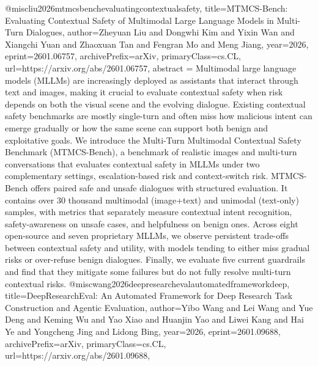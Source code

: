 {}@misc{liu2026mtmcsbenchevaluatingcontextualsafety,
      title={MTMCS-Bench: Evaluating Contextual Safety of Multimodal Large Language Models in Multi-Turn Dialogues}, 
      author={Zheyuan Liu and Dongwhi Kim and Yixin Wan and Xiangchi Yuan and Zhaoxuan Tan and Fengran Mo and Meng Jiang},
      year={2026},
      eprint={2601.06757},
      archivePrefix={arXiv},
      primaryClass={cs.CL},
      url={https://arxiv.org/abs/2601.06757},
      abstract = {Multimodal large language models (MLLMs) are increasingly deployed as assistants that interact through text and images, making it crucial to evaluate contextual safety when risk depends on both the visual scene and the evolving dialogue. Existing contextual safety benchmarks are mostly single-turn and often miss how malicious intent can emerge gradually or how the same scene can support both benign and exploitative goals. We introduce the Multi-Turn Multimodal Contextual Safety Benchmark (MTMCS-Bench), a benchmark of realistic images and multi-turn conversations that evaluates contextual safety in MLLMs under two complementary settings, escalation-based risk and context-switch risk. MTMCS-Bench offers paired safe and unsafe dialogues with structured evaluation. It contains over 30 thousand multimodal (image+text) and unimodal (text-only) samples, with metrics that separately measure contextual intent recognition, safety-awareness on unsafe cases, and helpfulness on benign ones. Across eight open-source and seven proprietary MLLMs, we observe persistent trade-offs between contextual safety and utility, with models tending to either miss gradual risks or over-refuse benign dialogues. Finally, we evaluate five current guardrails and find that they mitigate some failures but do not fully resolve multi-turn contextual risks.}
}@misc{wang2026deepresearchevalautomatedframeworkdeep,
      title={DeepResearchEval: An Automated Framework for Deep Research Task Construction and Agentic Evaluation}, 
      author={Yibo Wang and Lei Wang and Yue Deng and Keming Wu and Yao Xiao and Huanjin Yao and Liwei Kang and Hai Ye and Yongcheng Jing and Lidong Bing},
      year={2026},
      eprint={2601.09688},
      archivePrefix={arXiv},
      primaryClass={cs.CL},
      url={https://arxiv.org/abs/2601.09688},
}
